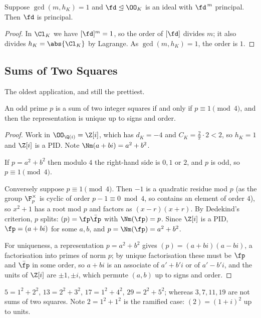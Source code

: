 \begin{lemma}\label{lem:coprimeclass}
	Suppose $\gcd(m, h_K) = 1$ and $\fd \trianglelefteq \OO_K$ is an ideal with $\fd^{\,m}$ principal. Then $\fd$ is principal.
\end{lemma}

\begin{proof}
	In $\Cl_K$ we have $[\fd]^m = 1$, so the order of $[\fd]$ divides $m$; it also divides $h_K = \abs{\Cl_K}$ by Lagrange. As $\gcd(m,h_K)=1$, the order is $1$.
\end{proof}

\subsection{Sums of Two Squares}

The oldest application, and still the prettiest.

\begin{theorem}[Fermat]\label{nf-thm:twosquares}
	An odd prime $p$ is a sum of two integer squares if and only if $p \equiv 1 \pmod 4$, and then the representation is unique up to signs and order.
\end{theorem}

\begin{proof}
	Work in $\OO_{\Q(i)} = \Z[i]$, which has $d_K = -4$ and $C_K = \tfrac2\pi\cdot2 < 2$, so $h_K = 1$ and $\Z[i]$ is a PID. Note $\Nm(a+bi) = a^2+b^2$.

	If $p = a^2+b^2$ then modulo $4$ the right-hand side is $0, 1$ or $2$, and $p$ is odd, so $p \equiv 1 \pmod 4$.

	Conversely suppose $p \equiv 1\pmod 4$. Then $-1$ is a quadratic residue mod $p$ (as the group $\F_p^\times$ is cyclic of order $p-1 \equiv 0 \bmod 4$, so contains an element of order $4$), so $x^2+1$ has a root mod $p$ and factors as $(x-r)(x+r)$. By Dedekind's criterion, $p$ splits: $(p) = \fp\bar\fp$ with $\Nm(\fp) = p$. Since $\Z[i]$ is a PID, $\fp = (a+bi)$ for some $a,b$, and $p = \Nm(\fp) = a^2+b^2$.

	For uniqueness, a representation $p = a^2+b^2$ gives $(p) = (a+bi)(a-bi)$, a factorisation into primes of norm $p$; by unique factorisation these must be $\fp$ and $\bar\fp$ in some order, so $a+bi$ is an associate of $a'+b'i$ or of $a'-b'i$, and the units of $\Z[i]$ are $\pm1,\pm i$, which permute $(a,b)$ up to signs and order.
\end{proof}

\begin{example}
	$5 = 1^2+2^2$, $13 = 2^2+3^2$, $17 = 1^2+4^2$, $29 = 2^2+5^2$; whereas $3, 7, 11, 19$ are not sums of two squares. Note $2 = 1^2+1^2$ is the ramified case: $(2) = (1+i)^2$ up to units.
\end{example}

